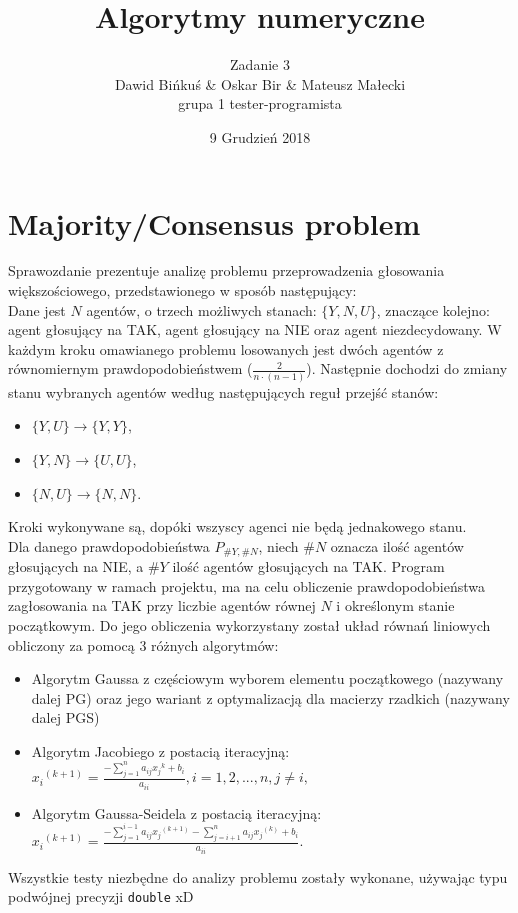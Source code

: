 \documentclass[10pt]{article}
\title{Algorytmy numeryczne}
\author{Zadanie 3 \\ Dawid Bińkuś \& Oskar Bir \& Mateusz Małecki\\grupa 1 tester-programista}
\date{9 Grudzień 2018}
\begin{document}
\maketitle 

\section{Majority/Consensus problem}
Sprawozdanie prezentuje analizę problemu przeprowadzenia głosowania większościowego, przedstawionego w sposób następujący:\\
Dane jest $N$ agentów, o trzech możliwych stanach: $\{Y,N,U\}$, znaczące kolejno: agent głosujący na TAK, agent głosujący na NIE oraz agent niezdecydowany.
W każdym kroku omawianego problemu losowanych jest dwóch agentów z równomiernym prawdopodobieństwem ($\frac{2}{n\cdot (n-1)}$). Następnie dochodzi do zmiany stanu wybranych agentów według następujących reguł przejść stanów:
\begin{itemize}
	\item $\{Y,U\} \to \{Y,Y\}$,
	\item $\{Y,N\} \to \{U,U\}$,
	\item $\{N,U\} \to \{N,N\}$.
\end{itemize}
Kroki wykonywane są, dopóki wszyscy agenci nie będą jednakowego stanu.
\\
Dla danego prawdopodobieństwa $P_{\#Y,\#N}$, niech $\#N$ oznacza ilość agentów głosujących na NIE, a $\#Y$ ilość agentów głosujących na TAK.
Program przygotowany w ramach projektu, ma na celu obliczenie prawdopodobieństwa zagłosowania na TAK przy liczbie agentów równej $N$ i określonym stanie początkowym. Do jego obliczenia wykorzystany został układ równań liniowych obliczony za pomocą 3 różnych algorytmów:
\begin{itemize}
	\item Algorytm Gaussa z częściowym wyborem elementu początkowego (nazywany dalej PG) oraz jego wariant z optymalizacją dla macierzy rzadkich (nazywany dalej PGS)
	\item Algorytm Jacobiego z postacią iteracyjną:\\
	${x_{i}}^{(k+1)}=\frac{-\sum_{j=1}^{n}a_{ij}{x_j}^{k}+b_i}{a_{ii}}, i=1,2,...,n,  j\neq i,$
	\item Algorytm Gaussa-Seidela z postacią iteracyjną:\\
	${x_{i}}^{(k+1)}=\frac{-\sum_{j=1}^{i-1}a_{ij}{x_j}^{(k+1)}-\sum_{j=i+1}^{n}a_{ij}{x_j}^{(k)}+b_i}{a_{ii}}.$
\end{itemize}
Wszystkie testy niezbędne do analizy problemu zostały wykonane, używając typu podwójnej precyzji \texttt{double}
xD
\end{document}
